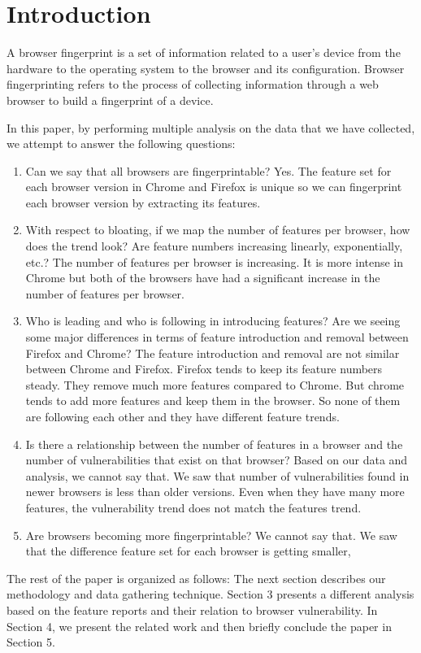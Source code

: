 \section{Introduction}
\label{sec:introduction}

A browser fingerprint is a set of information related to a user’s device from the hardware to
the operating system to the browser and its configuration. Browser fingerprinting refers to the
process of collecting information through a web browser to build a fingerprint of a device.




In this paper, by performing multiple analysis on the data that we have collected, we attempt to answer
the following questions:

\begin{enumerate}
  \item Can we say that all browsers are fingerprintable?
  Yes. The feature set for each browser version in Chrome and Firefox is unique so we can fingerprint each browser version by extracting its features.
  \item With respect to bloating, if we map the number of features per browser, how does the trend look? Are feature numbers increasing linearly, exponentially, etc.? The number of features per browser is increasing. It is more intense in Chrome but both of the browsers have had a significant increase in the number of features per browser.
  \item Who is leading and who is following in introducing features? Are we seeing some major differences in terms of feature introduction and removal between Firefox and Chrome? The feature introduction and removal are not similar between Chrome and Firefox. Firefox tends to keep its feature numbers steady. They remove much more features compared to Chrome. But chrome tends to add more features and keep them in the browser. So none of them are following each other and they have different feature trends.
  \item Is there a relationship between the number of features in a browser and the number of vulnerabilities that exist on that browser? Based on our data and analysis, we cannot say that. We saw that number of vulnerabilities found in newer browsers is less than older versions. Even when they have many more features, the vulnerability trend does not match the features trend.
  \item Are browsers becoming more fingerprintable? We cannot say that. We saw that the difference feature set for each browser is getting smaller, 
\end{enumerate}

The rest of the paper is organized as follows: The next section describes our methodology and data gathering technique. Section 3 presents a different analysis based on the feature reports and their relation to browser vulnerability. In Section 4, we present the related work and then briefly conclude the paper in Section 5.

